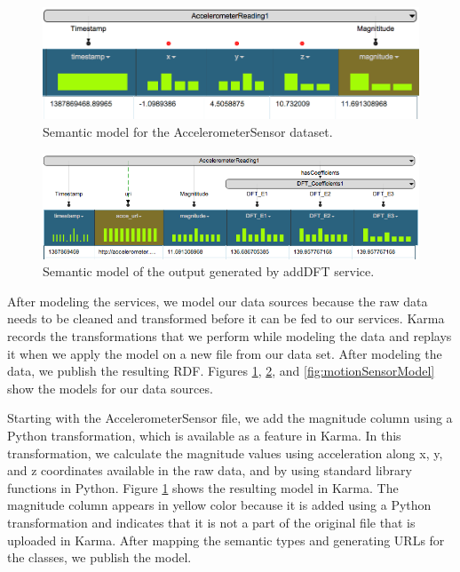 \begin{figure}[ht!]
\centering
\includegraphics[width=117mm]{img/AccelerometerReadingModel}
\caption{Semantic model for the AccelerometerSensor dataset.\label{fig:AccelerometerReadingModel}}
\end{figure}

\begin{figure}[b]
\centering
\includegraphics[width=177mm]{img/DFToutput}
\caption{Semantic model of the output generated by addDFT service. \label{fig:DFToutput}}
\end{figure}

After modeling the services, we model our data sources because the raw data needs to be cleaned and transformed before it can be fed to our services. Karma records the transformations that we perform while modeling the data and replays it when we apply the model on a new file from our data set. After modeling the data, we publish the resulting RDF. Figures \ref{fig:AccelerometerReadingModel}, \ref{fig:DFToutput}, and \ref{fig:motionSensorModel} show the models for our data sources.

Starting with the AccelerometerSensor file, we add the magnitude column using a Python transformation, which is available as a feature in Karma. In this transformation, we calculate the magnitude values using acceleration along x, y, and z coordinates available in the raw data, and by using standard library functions in Python. Figure \ref{fig:AccelerometerReadingModel} shows the resulting model in Karma. The magnitude column appears in yellow color because it is added using a Python transformation and indicates that it is not a part of the original file that is uploaded in Karma. After mapping the semantic types and generating URLs for the classes, we publish the model.

